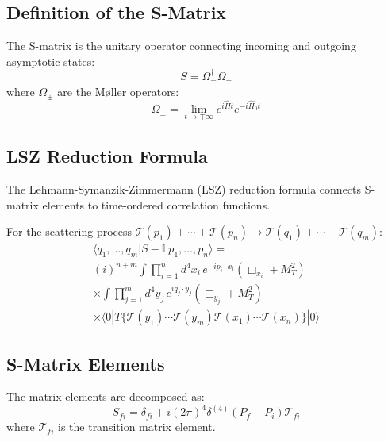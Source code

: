 \subsection{Definition of the S-Matrix}

\begin{definition}[S-Matrix]
The S-matrix is the unitary operator connecting incoming and outgoing asymptotic states:
\begin{equation}
    S = \Omega_-^\dagger \Omega_+
\end{equation}
where $\Omega_\pm$ are the Møller operators:
\begin{equation}
    \Omega_\pm = \lim_{t \to \mp\infty} e^{i\hat{H}t} e^{-i\hat{H}_0 t}
\end{equation}
\end{definition}

\subsection{LSZ Reduction Formula}

The Lehmann-Symanzik-Zimmermann (LSZ) reduction formula connects S-matrix elements to time-ordered correlation functions.

\begin{theorem}
For the scattering process $\mathcal{T}(p_1) + \cdots + \mathcal{T}(p_n) \to \mathcal{T}(q_1) + \cdots + \mathcal{T}(q_m)$:
\begin{multline}
    \langle q_1, \ldots, q_m | S - \mathbb{I} | p_1, \ldots, p_n \rangle = \\
    (i)^{n+m} \int \prod_{i=1}^n d^4x_i \, e^{-ip_i \cdot x_i} (\Box_{x_i} + M_T^2) \\
    \times \int \prod_{j=1}^m d^4y_j \, e^{iq_j \cdot y_j} (\Box_{y_j} + M_T^2) \\
    \times \langle 0 | T\{\mathcal{T}(y_1) \cdots \mathcal{T}(y_m) \mathcal{T}(x_1) \cdots \mathcal{T}(x_n)\} | 0 \rangle
\end{multline}
\end{theorem}

\subsection{S-Matrix Elements}

The matrix elements are decomposed as:
\begin{equation}
    S_{fi} = \delta_{fi} + i (2\pi)^4 \delta^{(4)}(P_f - P_i) \mathcal{T}_{fi}
\end{equation}
where $\mathcal{T}_{fi}$ is the transition matrix element.

